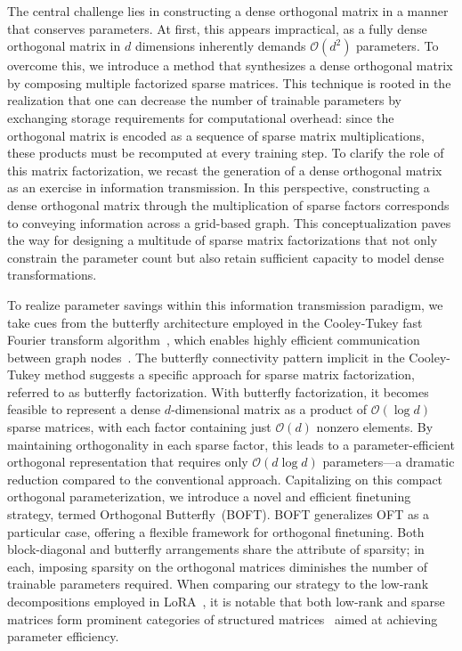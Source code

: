 The central challenge lies in constructing a dense orthogonal matrix in a manner that conserves parameters. At first, this appears impractical, as a fully dense orthogonal matrix in $d$ dimensions inherently demands $\mathcal{O}(d^2)$ parameters. To overcome this, we introduce a method that synthesizes a dense orthogonal matrix by composing multiple factorized sparse matrices. This technique is rooted in the realization that one can decrease the number of trainable parameters by exchanging storage requirements for computational overhead: since the orthogonal matrix is encoded as a sequence of sparse matrix multiplications, these products must be recomputed at every training step. To clarify the role of this matrix factorization, we recast the generation of a dense orthogonal matrix as an exercise in information transmission. In this perspective, constructing a dense orthogonal matrix through the multiplication of sparse factors corresponds to conveying information across a grid-based graph. This conceptualization paves the way for designing a multitude of sparse matrix factorizations that not only constrain the parameter count but also retain sufficient capacity to model dense transformations.

To realize parameter savings within this information transmission paradigm, we take cues from the butterfly architecture employed in the Cooley-Tukey fast Fourier transform algorithm~\cite{cooley1965algorithm}, which enables highly efficient communication between graph nodes~\cite{klasing1994broadcasting}. The butterfly connectivity pattern implicit in the Cooley-Tukey method suggests a specific approach for sparse matrix factorization, referred to as butterfly factorization. With butterfly factorization, it becomes feasible to represent a dense $d$-dimensional matrix as a product of $\mathcal{O}(\log d)$ sparse matrices, with each factor containing just $\mathcal{O}(d)$ nonzero elements. By maintaining orthogonality in each sparse factor, this leads to a parameter-efficient orthogonal representation that requires only $\mathcal{O}(d\log d)$ parameters—a dramatic reduction compared to the conventional approach. Capitalizing on this compact orthogonal parameterization, we introduce a novel and efficient finetuning strategy, termed Orthogonal Butterfly~(BOFT). BOFT generalizes OFT as a particular case, offering a flexible framework for orthogonal finetuning. Both block-diagonal and butterfly arrangements share the attribute of sparsity; in each, imposing sparsity on the orthogonal matrices diminishes the number of trainable parameters required. When comparing our strategy to the low-rank decompositions employed in LoRA~\cite{hulora2022}, it is notable that both low-rank and sparse matrices form prominent categories of structured matrices~\cite{candes2011robust} aimed at achieving parameter efficiency.

